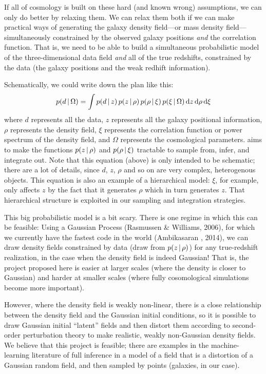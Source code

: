 \documentclass[12pt]{article}
\newcommand{\dd}{\mathrm{d}}
\begin{document}
If all of cosmology is built on these hard (and known wrong)
assumptions, we can only do better by relaxing them.
We can relax them both if we can make practical ways of generating the
galaxy density field---or mass density field---simultaneously
constrained by the observed galaxy positions \emph{and} the
correlation function.
That is, we need to be able to build a simultaneous probabilistic
model of the three-dimensional data field \emph{and} all of the true
redshifts, constrained by the data (the galaxy positions and the weak
redhift information).

Schematically, we could write down the plan like this:
\begin{equation}
p(d\given \Omega) = \int p(d\given z)\,p(z\given \rho)\,p(\rho\given \xi)\,p(\xi\given \Omega)\,\dd z\,\dd\rho\,\dd\xi
\end{equation}
where $d$ represents all the data, $z$ represents all the galaxy
positional information, $\rho$ represents the density field, $\xi$
represents the correlation function or power spectrum of the density
field, and $\Omega$ represents the cosmological parameters.
 aims to make the functions $p(z\,|\,\rho)$ and
$p(\rho\,|\,\xi)$ tractable to sample from, infer, and integrate out.
Note that this equation (above) is only intended to be schematic;
there are a lot of details, since $d$, $z$, $\rho$ and so on are very
complex, heterogenous objects.  This equation is also an example of a
hierarchical model: $\xi$, for example, only affects $z$ by the fact
that it generates $\rho$ which in turn generates $z$.  That
hierarchical structure is exploited in our sampling and integration
strategies.

This big probabilistic model is a bit scary.
There is one regime in which this can be feasible:
Using a Gaussian Process (Rasmussen \& Williams, 2006), for which we currently have
the fastest code in the world (Ambikasaran \etal, 2014), we can draw density fields
constrained by data (draw from $p(z\,|\,\rho)$) for any true-redshift realization, in the case
when the density field is indeed Gaussian!
That is, the project proposed here is easier at larger scales (where
the density is closer to Gaussian) and harder at smaller scales (where
fully cosomological simulations become more important).

However, where the density field is weakly non-linear, there is a close
relationship between the density field and the Gaussian initial
conditions, so it is possible to draw Gaussian initial ``latent''
fields and then distort them according to second-order perturbation
theory to make realistic, weakly non-Gaussian density fields.
We believe that this project is feasible; there are examples in
the machine-learning literature of full inference in a model of a
field that is a distortion of a Gaussian random field, and then
sampled by points (galaxies, in our case).
\end{document}
